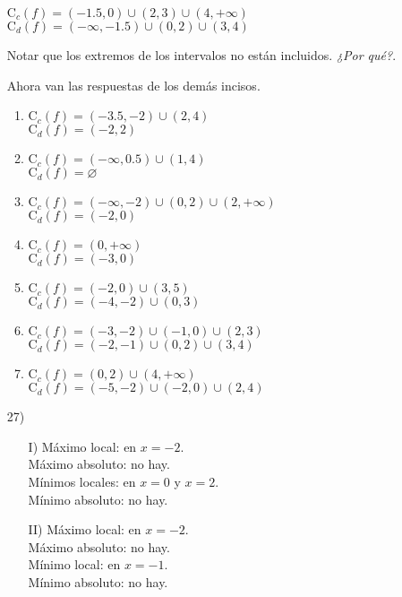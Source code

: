 \documentclass[12pt]{article}
\begin{document}
\begin{enumerate}
$\text{C}_c(f) = (-1.5,0) \cup (2,3) \cup (4,+\infty)$\\
$\text{C}_d(f) = (-\infty,-1.5) \cup (0,2) \cup (3,4)$

Notar que los extremos de los intervalos no están incluidos. \textit{¿Por qué?}.\par
Ahora van las respuestas de los demás incisos.

\begin{enumerate}
	\item $\text{C}_c(f) = (-3.5,-2) \cup (2,4)$\\
	$\text{C}_d(f) = (-2,2)$
	
	\item $\text{C}_c(f) = (-\infty,0.5) \cup (1,4)$\\
	$\text{C}_d(f) = \varnothing$

	\item $\text{C}_c(f) = (-\infty,-2) \cup (0,2) \cup (2,+\infty)$\\
	$\text{C}_d(f) = (-2,0)$ \addtocounter{enumii}{1}

	\item $\text{C}_c(f) = (0,+\infty)$\\
	$\text{C}_d(f) = (-3,0)$
	
	\item $\text{C}_c(f) = (-2,0) \cup (3,5)$\\
	$\text{C}_d(f) = (-4,-2) \cup (0,3)$

	\item $\text{C}_c(f) = (-3,-2) \cup (-1,0) \cup (2,3)$\\
	$\text{C}_d(f) = (-2,-1) \cup (0,2) \cup (3,4)$
	
	\item $\text{C}_c(f) = (0,2) \cup (4,+\infty)$\\
	$\text{C}_d(f) = (-5,-2) \cup (-2,0) \cup (2,4)$
\end{enumerate}
\item[27)] 
\begin{enumerate}
	\item[I)]
	Máximo local: en $x = -2$.\\
	Máximo absoluto: no hay.\\
	Mínimos locales: en $x = 0$ y $x = 2$.\\
	Mínimo absoluto: no hay.
	
	\item[II)]
	Máximo local: en $x = -2$.\\
	Máximo absoluto: no hay.\\
	Mínimo local: en $x = -1$.\\
	Mínimo absoluto: no hay.
	

\end{enumerate}
\end{enumerate}
\end{document}
